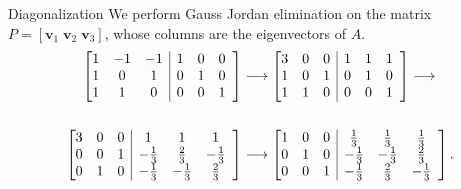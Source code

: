 \documentclass{beamer}
\def\v{\bm{v}}
\begin{document}
        \begin{frame}{Diagonalization}
                We perform Gauss Jordan elimination on the matrix $P = [\v_1\;\v_2\;\v_3]$, whose columns are the eigenvectors of $A$. \\
                \begin{align*}
                        \left[\begin{array}{@{}ccc|ccc}
                                1 & -1 & -1     & 1 & 0 & 0 \\
                                1 &  0 &  1     & 0 & 1 & 0 \\
                                1 &  1 &  0     & 0 & 0 & 1
                        \end{array}\right] &\longrightarrow
                        \left[\begin{array}{@{}ccc|ccc}
                                3 &  0 &  0     & 1 & 1 & 1 \\
                                1 &  0 &  1     & 0 & 1 & 0 \\
                                1 &  1 &  0     & 0 & 0 & 1
                        \end{array}\right] \longrightarrow \\\\
                        \left[\begin{array}{@{}ccc|ccc}
                                3 &  0 &  0     & 1 & 1 & 1 \\
                                0 &  0 &  1     & -\frac{1}{3} & \frac{2}{3} & -\frac{1}{3} \\
                                0 &  1 &  0     & -\frac{1}{3} & -\frac{1}{3} & \frac{2}{3}
                        \end{array}\right] &\longrightarrow
                        \left[\begin{array}{@{}ccc|ccc}
                                1 &  0 &  0     & \frac{1}{3} & \frac{1}{3} & \frac{1}{3} \\
                                0 &  1 &  0     & -\frac{1}{3} & -\frac{1}{3} & \frac{2}{3} \\
                                0 &  0 &  1     & -\frac{1}{3} & \frac{2}{3} & -\frac{1}{3}
                        \end{array}\right].
                \end{align*}
        \end{frame}
\end{document}
